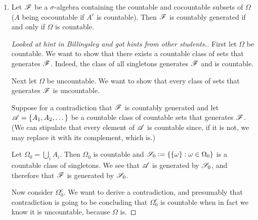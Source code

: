 \begin{enumerate}
\begin{enumerate}[label=(\alph*)]
\begin{proof}
      For inclusion in the other direction, note that for all $a, b \in \R$ with $a < b$
      \begin{align*}
        (a, b) = \bigcup_{\substack{p, q \in \Q\\a < p < q < b}} (p, q).
      \end{align*}
      Therefore $\sigma(\ms I_1) \subseteq \sigma(\ms I_2)$. But $\sigma(\ms I_1) = \sigma(\ms O)$ from lemma
      (\ref{hw3-2-11-lemma-1}) hence $\sigma(\ms O) \subseteq \sigma(\ms I_2)$.
    \end{proof}
  \item
    \begin{claim*}
      Let $\mathscr F$ be a $\sigma$-algebra containing the countable and cocountable subsets of $\Omega$ ($A$ being
      cocountable if $A^c$ is countable). Then $\mathscr F$ is countably generated if and only if $\Omega$ is
      countable.
    \end{claim*}
    \begin{proof}
      [Looked at hint in Billingsley and got hints from other students.]

      First let $\Omega$ be countable. We want to show that there exists a countable class of sets that
      generates $\mathscr F$. Indeed, the class of all singletons generates $\mathscr F$ and is countable.

      Next let $\Omega$ be uncountable. We want to show that every class of sets that generates $\mathscr F$ is
      uncountable.

      Suppose for a contradiction that $\mathscr F$ is countably generated and let $\mathscr A = \{A_1, A_2, \dots\}$ be
      a countable class of countable sets that generates $\mathscr F$. (We can stipulate that every element
      of $\mathscr A$ is countable since, if it is not, we may replace it with its complement, which is.)

      Let $\Omega_0 = \bigcup_i A_i$. Then $\Omega_0$ is countable
      and $\mathscr S_0 := \{\{\omega\}: \omega \in \Omega_0\}$ is a countable class of singletons. We see that $\mathscr A$ is
      generated by $\mathscr S_0$, and therefore that $\mathscr F$ is generated by $\mathscr S_0$.

      Now consider $\Omega^c_0$. We want to derive a contradiction, and presumably that contradiction is going
      to be concluding that $\Omega^c_0$ is countable when in fact we know it is uncountable, because $\Omega$
      is. 
    \end{proof}
  \end{enumerate}


\end{enumerate}
